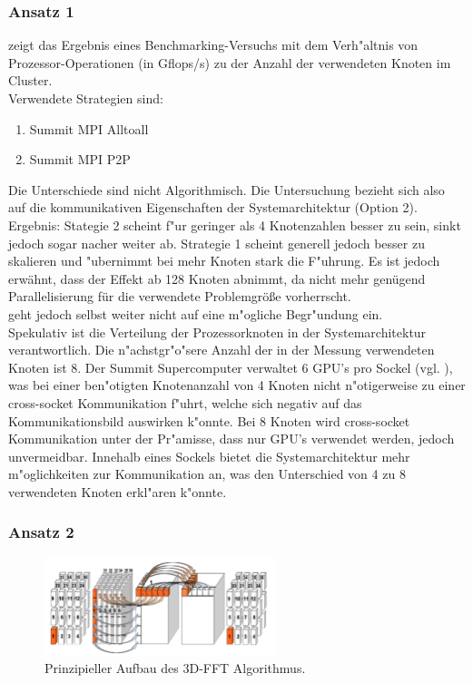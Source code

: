 \subsubsection{Ansatz 1}
\cite[Abbildung 4]{mainpaper} zeigt das Ergebnis eines Benchmarking-Versuchs mit dem Verh"altnis von Prozessor-Operationen (in Gflops/s) zu der Anzahl der verwendeten Knoten im Cluster.\\
Verwendete Strategien sind:
\begin{enumerate}
	\item Summit MPI Alltoall
	\item Summit MPI P2P
\end{enumerate}
Die Unterschiede sind nicht Algorithmisch. Die Untersuchung bezieht sich also auf die kommunikativen Eigenschaften der Systemarchitektur (Option 2).\\
Ergebnis: Stategie 2 scheint f"ur geringer als 4 Knotenzahlen besser zu sein, sinkt jedoch sogar nacher weiter ab.
Strategie 1 scheint generell jedoch besser zu skalieren und "ubernimmt bei mehr Knoten stark die F"uhrung. Es ist jedoch erwähnt, dass der Effekt ab 128 Knoten abnimmt, da nicht mehr genügend Parallelisierung für die verwendete Problemgröße vorherrscht.\\
\cite{mainpaper} geht jedoch selbst weiter nicht auf eine m"ogliche Begr"undung ein.\\
Spekulativ ist die Verteilung der Prozessorknoten in der Systemarchitektur verantwortlich. Die n"achstgr"o"sere Anzahl der in der Messung verwendeten Knoten ist 8. Der Summit Supercomputer verwaltet 6 GPU's pro Sockel (vgl. \cite{summit,osummit}), was bei einer ben"otigten Knotenanzahl von 4 Knoten nicht n"otigerweise zu einer cross-socket Kommunikation f"uhrt, welche sich negativ auf das Kommunikationsbild auswirken k"onnte. Bei 8 Knoten wird cross-socket Kommunikation unter der Pr"amisse, dass nur GPU's verwendet werden, jedoch unvermeidbar. Innehalb eines Sockels bietet die Systemarchitektur mehr m"oglichkeiten zur Kommunikation an, was den Unterschied von 4 zu 8 verwendeten Knoten erkl"aren k"onnte.

\subsubsection{Ansatz 2}
\begin{figure}
\centering
\includegraphics[width=0.6\textwidth]{res/algo.png}
\caption{\cite[Abb. 2]{mainpaper} Prinzipieller Aufbau des 3D-FFT Algorithmus. }
	\label{fig:algo}
\end{figure}

